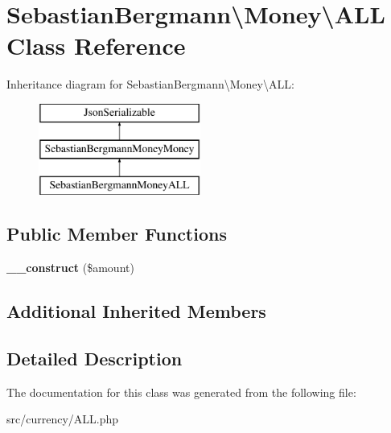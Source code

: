 \hypertarget{classSebastianBergmann_1_1Money_1_1ALL}{}\section{Sebastian\+Bergmann\textbackslash{}Money\textbackslash{}A\+L\+L Class Reference}
\label{classSebastianBergmann_1_1Money_1_1ALL}
Inheritance diagram for Sebastian\+Bergmann\textbackslash{}Money\textbackslash{}A\+L\+L\+:\begin{figure}[H]
\begin{center}
\leavevmode
\includegraphics[height=3.000000cm]{classSebastianBergmann_1_1Money_1_1ALL}
\end{center}
\end{figure}
\subsection*{Public Member Functions}
\begin{DoxyCompactItemize}
\item 
\hypertarget{classSebastianBergmann_1_1Money_1_1ALL_aa4d8c073810d0b06f7e8052df8c891e4}{}{\bfseries \+\_\+\+\_\+construct} (\$amount)\label{classSebastianBergmann_1_1Money_1_1ALL_aa4d8c073810d0b06f7e8052df8c891e4}

\end{DoxyCompactItemize}
\subsection*{Additional Inherited Members}


\subsection{Detailed Description}


The documentation for this class was generated from the following file\+:\begin{DoxyCompactItemize}
\item 
src/currency/A\+L\+L.\+php\end{DoxyCompactItemize}
